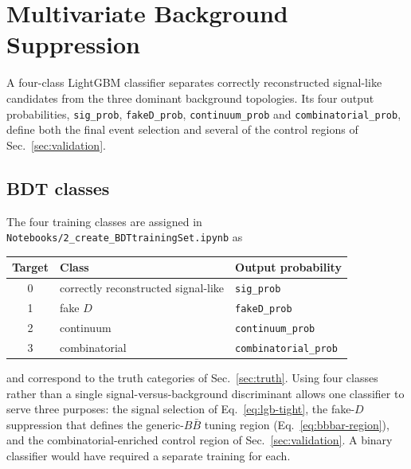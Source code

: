 \section{Multivariate Background Suppression}
\label{sec:mva}

A four-class LightGBM classifier separates correctly reconstructed signal-like
candidates from the three dominant background topologies.
Its four output probabilities, \texttt{sig\_prob}, \texttt{fakeD\_prob},
\texttt{continuum\_prob} and \texttt{combinatorial\_prob}, define both the
final event selection and several of the control regions of
Sec.~\ref{sec:validation}.

\subsection{BDT classes}
\label{sec:mva:classes}

The four training classes are assigned in
\texttt{Notebooks/2\_create\_BDTtrainingSet.ipynb} as
\begin{center}
\begin{tabular}{c l l}
  \hline
  Target & Class & Output probability \\
  \hline
  0 & correctly reconstructed signal-like & \texttt{sig\_prob} \\
  1 & fake $D$ & \texttt{fakeD\_prob} \\
  2 & continuum & \texttt{continuum\_prob} \\
  3 & combinatorial & \texttt{combinatorial\_prob} \\
  \hline
\end{tabular}
\end{center}
and correspond to the truth categories of Sec.~\ref{sec:truth}.
Using four classes rather than a single signal-versus-background
discriminant allows one classifier to serve three purposes: the signal
selection of Eq.~\eqref{eq:lgb-tight}, the fake-$D$ suppression that defines
the generic-$B\bar{B}$ tuning region (Eq.~\eqref{eq:bbbar-region}), and the
combinatorial-enriched control region of Sec.~\ref{sec:validation}.
A binary classifier would have required a separate training for each.

